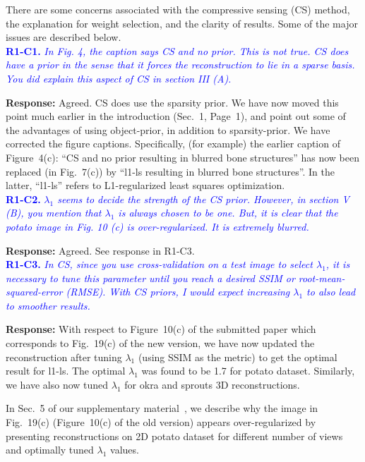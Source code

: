 \documentclass{article}
\begin{document}
There are some concerns associated with the compressive sensing (CS) method, the explanation for weight selection, and the clarity of results. Some of the major issues are described below. \\

\textcolor{blue}{\textbf{R1-C1.}\textit{ In Fig. 4, the caption says CS and no prior. This is not true. CS does have a prior in the sense that it forces the reconstruction to lie in a sparse basis. You did explain this aspect of CS in section III (A).}}

\textbf{Response:} Agreed.  CS does use the sparsity prior. We have now moved this point much earlier in the introduction  (Sec.~1, Page~1), and point out some of the advantages of using object-prior, in addition to sparsity-prior. We have corrected the figure captions. Specifically, (for example) the earlier caption of Figure~4(c): ``CS and no prior resulting in blurred bone structures'' has now been replaced (in Fig.~7(c)) by ``l1-ls resulting in blurred bone structures''. In the latter, ``l1-ls'' refers to L1-regularized least squares optimization. \\

\textcolor{blue}{\textbf{R1-C2.}\textit{ $\lambda_1$ seems to decide the strength of the CS prior. However, in section V (B), you mention that $\lambda_1$ is always chosen to be one. But, it is clear that the potato image in Fig. 10 (c) is over-regularized. It is extremely blurred.}}

\textbf{Response:} Agreed. See response in R1-C3.\\

\textcolor{blue}{\textbf{R1-C3.}\textit{ In CS, since you use cross-validation on a test image to select $\lambda_1$, it is necessary to tune this parameter until you reach a desired SSIM or root-mean-squared-error (RMSE). With CS priors, I would expect increasing $\lambda_1$ to also lead to smoother results.}}  

\textbf{Response:} With respect to Figure~10(c) of the submitted paper which corresponds to Fig.~19(c) of the new version, we have now updated the reconstruction after tuning $\lambda_1$ (using SSIM as the metric) to get the optimal result for l1-ls. The optimal $\lambda_1$ was found to be 1.7 for potato dataset. Similarly, we have also now tuned $\lambda_1$ for okra and sprouts 3D reconstructions. 

In Sec.~5 of our supplementary material~\cite{supp_paper}, we describe why the image in Fig.~19(c) (Figure~10(c) of the old version) appears over-regularized by presenting reconstructions on 2D potato dataset for different number of views and optimally tuned $\lambda_1$ values.   \\
\end{document}

